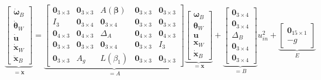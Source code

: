 \begin{equation}
	\underbrace{
		\begin{bmatrix}
			\dot{\boldsymbol{\omega}}_B \\
			\dot{\boldsymbol{\theta}}_W \\
			\dot{\mathbf{u}}            \\
			\dot{\mathbf{x}}_W          \\
			\ddot{\mathbf{x}}_B
		\end{bmatrix}
	}_{=\dot{\mathbf{x}}} =
	\underbrace{
	\begin{bmatrix}
		\mathbf{0}_{3\times 3} & \mathbf{0}_{3\times 3} & A(\boldsymbol{\beta})  & \mathbf{0}_{3\times 3} & \mathbf{0}_{3\times 3} \\
		I_3                    & \mathbf{0}_{3\times 4} & \mathbf{0}_{3\times 4} & \mathbf{0}_{3\times 3} & \mathbf{0}_{3\times 3} \\
		\mathbf{0}_{4\times 3} & \mathbf{0}_{4\times 3} & \Delta_A               & \mathbf{0}_{4\times 3} & \mathbf{0}_{4\times 3} \\
		\mathbf{0}_{3\times 3} & \mathbf{0}_{3\times 3} & \mathbf{0}_{3\times 4} & \mathbf{0}_{3\times 3} & I_3                    \\
		\mathbf{0}_{3\times 3} & A_g                    & L(\beta_1)             & \mathbf{0}_{3\times 3} & \mathbf{0}_{3\times 3}
	\end{bmatrix}
	}_{=A}
	\underbrace{
		\begin{bmatrix}
			\boldsymbol{\omega}_B \\
			\boldsymbol{\theta}_W \\
			\mathbf{u}            \\ 
			\mathbf{x}_W          \\
			\dot{\mathbf{x}}_B
		\end{bmatrix}
	}_{=\mathbf{x}} + 
	\underbrace{
	\begin{bmatrix}
		\mathbf{0}_{3\times 4} \\
		\mathbf{0}_{3\times 4} \\
		\Delta_B               \\
		\mathbf{0}_{3\times 4} \\
		\mathbf{0}_{3\times 4}
	\end{bmatrix}
	}_{=B} u_{in}^2
	+\underbrace{
	\begin{bmatrix}
		\mathbf{0}_{15\times 1} \\
		-g
	\end{bmatrix}}_{E}
\end{equation} 

